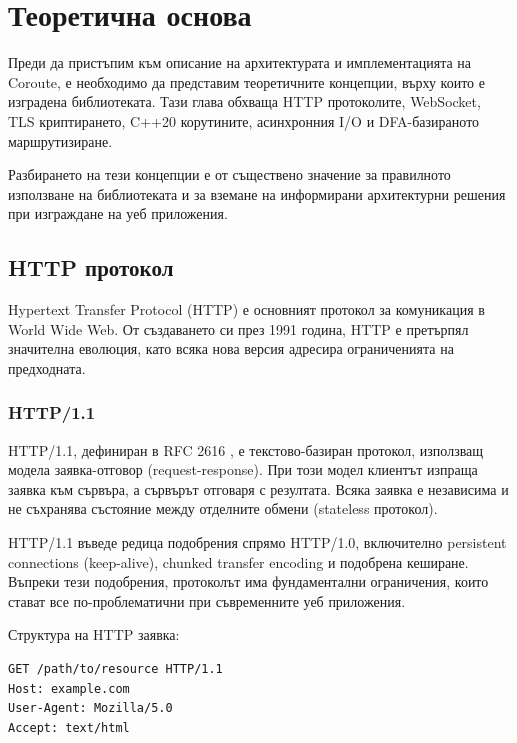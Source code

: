 \section{Теоретична основа}
\label{sec:theoretical_background}

Преди да пристъпим към описание на архитектурата и имплементацията на Coroute, е необходимо да представим теоретичните концепции, върху които е изградена библиотеката. Тази глава обхваща HTTP протоколите, WebSocket, TLS криптирането, C++20 корутините, асинхронния I/O и DFA-базираното маршрутизиране.

Разбирането на тези концепции е от съществено значение за правилното използване на библиотеката и за вземане на информирани архитектурни решения при изграждане на уеб приложения.

\subsection{HTTP протокол}

Hypertext Transfer Protocol (HTTP) е основният протокол за комуникация в World Wide Web. От създаването си през 1991 година, HTTP е претърпял значителна еволюция, като всяка нова версия адресира ограниченията на предходната.

\subsubsection{HTTP/1.1}

HTTP/1.1, дефиниран в RFC 2616 \cite{rfc2616}, е текстово-базиран протокол, използващ модела заявка-отговор (request-response). При този модел клиентът изпраща заявка към сървъра, а сървърът отговаря с резултата. Всяка заявка е независима и не съхранява състояние между отделните обмени (stateless протокол).

HTTP/1.1 въведе редица подобрения спрямо HTTP/1.0, включително persistent connections (keep-alive), chunked transfer encoding и подобрена кеширане. Въпреки тези подобрения, протоколът има фундаментални ограничения, които стават все по-проблематични при съвременните уеб приложения.

Структура на HTTP заявка:
\begin{verbatim}
GET /path/to/resource HTTP/1.1
Host: example.com
User-Agent: Mozilla/5.0
Accept: text/html
\end{verbatim}

